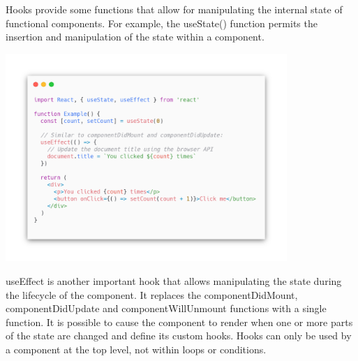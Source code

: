 Hooks provide some functions that allow for manipulating the internal state of functional components. For example, the useState() function permits the insertion and manipulation of the state within a component.

\begin{center}
    \includegraphics[width=0.8\textwidth]{assets/hooks.png}
\end{center}

useEffect is another important hook that allows manipulating the state during the lifecycle of the component. It replaces the componentDidMount, componentDidUpdate and componentWillUnmount functions with a single function. It is possible to cause the component to render when one or more parts of the state are changed and define its custom hooks. Hooks can only be used by a component at the top level, not within loops or conditions.